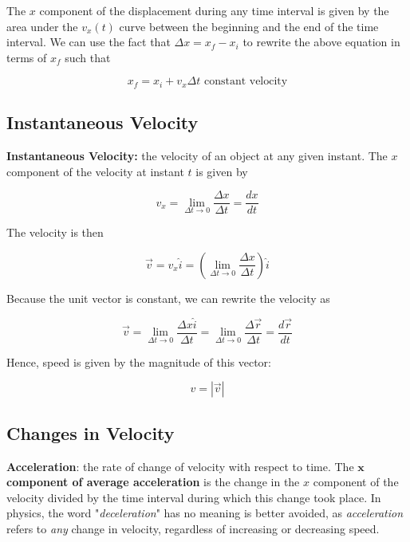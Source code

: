         \noindent The $x$ component of the displacement during any time interval is given by the area under the $v_x (t)$ curve between the beginning and the end of the time interval. We can use the fact that
        $\Delta x = x_f - x_i$ to rewrite the above equation in terms of $x_f$ such that

        \[
            x_f = x_i + v_x \Delta t \text{ constant velocity}
        \]



    \subsection{Instantaneous Velocity}
        \textbf{Instantaneous Velocity:} the velocity of an object at any given instant. The $x$ component of the velocity at instant $t$ is given by

        \[
            v_x = \lim_{\Delta t\to 0} \frac{\Delta x}{\Delta t} = \frac{dx}{dt}
        \]

        The velocity is then

        \[
            \overrightarrow{v} = v_x \hat{i} = \left(\lim_{\Delta t\to 0} \frac{\Delta x}{\Delta t}\right) \hat{i}
        \]

        Because the unit vector is constant, we can rewrite the velocity as

        \[
            \overrightarrow{v} = \lim_{\Delta t\to 0} \frac{\Delta x \hat{i}}{\Delta t} = \lim_{\Delta t\to 0}\frac{\Delta \overrightarrow{r}}{\Delta t} = \frac{d\overrightarrow{r}}{dt}
        \]

        Hence, speed is given by the magnitude of this vector:

        \[
            v = |\overrightarrow{v}|
        \]



    \subsection{Changes in Velocity}
        \textbf{Acceleration}: the rate of change of velocity with respect to time. The $\bm{x}$ \textbf{component of average acceleration} is the change in the $x$ component of the velocity divided by the time interval
        during which this change took place. In physics, the word "\textit{deceleration}" has no meaning is better avoided, as \textit{acceleration} refers to \textit{any} change in velocity, regardless of increasing
        or decreasing speed. \\

